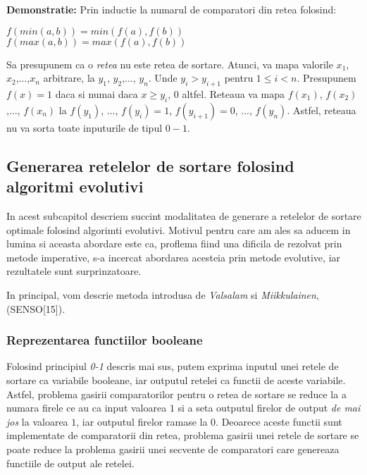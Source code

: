 \documentclass[12pt]{article}
\newenvironment{tightcenter}{%
  \setlength\topsep{0pt}
  \setlength\parskip{0pt}
  \begin{center}
}{%
  \end{center}
}
\begin{document}
\textbf{Demonstratie:} Prin inductie la numarul de comparatori din retea folosind:
\begin{tightcenter} 
 $f(min(a, b)) = min(f(a), f(b))$\\
 $f(max(a, b)) = max(f(a), f(b))$\\
\end{tightcenter}

Sa presupunem ca o \textit{retea} nu este retea de sortare. Atunci, va mapa valorile $x_1$, $x_2$,...,$x_n$ arbitrare, la $y_1$, $y_2$,..., $y_n$. Unde $y_i > y_{i+1}$ pentru $1 \leq i  < n$. Presupunem $f(x) = 1$ daca si numai daca $x \geq y_i$, $0$ altfel. Reteaua va mapa $f(x_1)$, $f(x_2)$,..., $f(x_n)$ la $f(y_1)$, ..., $f(y_i)=1$, $f(y_{i+1})=0$, ..., $f(y_n)$. Astfel, reteaua nu va sorta toate inputurile de tipul $0-1$.



\subsection{Generarea retelelor de sortare folosind algoritmi evolutivi}

In acest subcapitol descriem succint modalitatea de generare a retelelor de sortare optimale folosind algorimti evolutivi. Motivul pentru care am ales sa aducem in lumina si aceasta abordare este ca, proflema fiind una dificila de rezolvat prin metode imperative, s-a incercat abordarea acesteia prin metode evolutive, iar rezultatele sunt surprinzatoare.

In principal, vom descrie metoda introdusa de \textit{Valsalam} si \textit{Miikkulainen}, (SENSO[15]). 

\subsubsection{Reprezentarea functiilor booleane}

Folosind principiul \textit{0-1} descris mai sus, putem exprima inputul unei retele de sortare ca variabile booleane, iar outputul retelei ca functii de aceste variabile. Astfel, problema gasirii comparatorilor pentru o retea de sortare se reduce la a numara firele ce au ca input valoarea $1$ si a seta outputul firelor de output \textit{de mai jos} la valoarea $1$, iar outputul firelor ramase la $0$. Deoarece aceste functii sunt implementate de comparatorii din retea, problema gasirii unei retele de sortare se poate reduce la problema gasirii unei secvente de comparatori care genereaza functiile de output ale retelei. 
\end{document}
